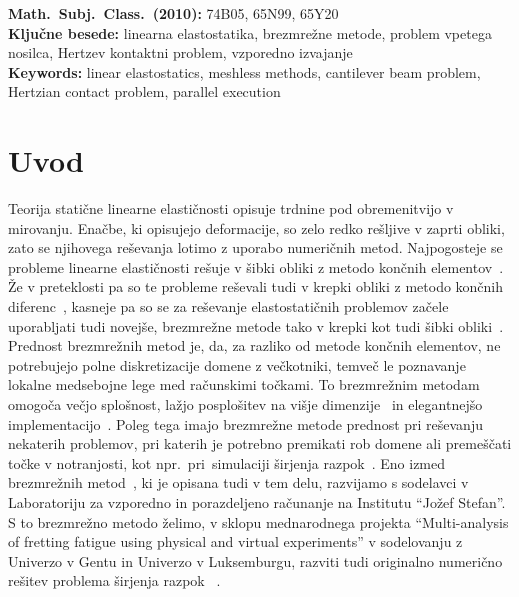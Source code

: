 \documentclass[12pt,a4paper,twoside]{article}
\theoremstyle{definition} %
\theoremstyle{plain} %
\numberwithin{equation}{section}
\let\oldsection\section
\def\section{\cleardoublepage\oldsection}
\begin{document}
\vfill

\noindent
\textbf{Math.~Subj.~Class.~(2010):} 74B05, 65N99, 65Y20 \\[1mm]
\textbf{Ključne besede:} linearna elastostatika, brezmrežne metode, problem vpetega nosilca, Hertzev
kontaktni problem, vzporedno izvajanje \\[1mm]
\textbf{Keywords:} linear elastostatics, meshless methods, cantilever beam problem, Hertzian contact
problem, parallel execution

\cleardoublepage

\setcounter{page}{1}

\section{Uvod}


Teorija statične linearne elastičnosti opisuje trdnine pod obremenitvijo v mirovanju. Enačbe, ki
opisujejo deformacije, so zelo redko rešljive v zaprti obliki, zato se njihovega reševanja lotimo z
uporabo numeričnih metod. Najpogosteje se  probleme linearne elastičnosti rešuje v šibki obliki z
metodo končnih elementov~\cite{uienkiewicz2000finite}. Že v preteklosti pa so te probleme reševali
tudi v krepki obliki z metodo končnih diferenc~\cite{hattel1995control}, kasneje pa so se za
reševanje elastostatičnih problemov začele uporabljati tudi novejše, brezmrežne metode tako v krepki
kot tudi šibki obliki~\cite{chen2006meshless,mavric2015local}. Prednost brezmrežnih metod je, da, za
razliko od metode končnih elementov, ne potrebujejo polne diskretizacije domene z večkotniki, temveč
le poznavanje lokalne medsebojne lege med računskimi točkami. To brezmrežnim metodam omogoča večjo
splošnost, lažjo posplošitev na višje dimenzije~\cite{dehghan2014numerical,li2013localized} in
elegantnejšo implementacijo~\cite{utils_web}. Poleg tega imajo brezmrežne metode prednost pri
reševanju nekaterih problemov, pri katerih je potrebno premikati rob domene ali premeščati točke v
notranjosti, kot npr.~pri~simulaciji širjenja razpok~\cite{rao2000efficient}. Eno izmed brezmrežnih
metod~\cite{kosec2016local}, ki je opisana tudi v tem delu, razvijamo s sodelavci v Laboratoriju za
vzporedno in porazdeljeno računanje na Institutu ``Jožef Stefan''. S to brezmrežno metodo želimo, v
sklopu mednarodnega projekta ``Multi-analysis of fretting fatigue using physical and virtual
experiments'' v sodelovanju z Univerzo v Gentu in Univerzo v Luksemburgu, razviti tudi originalno
numerično rešitev problema širjenja razpok~\cite{pereira2016convergence} .
\end{document}
